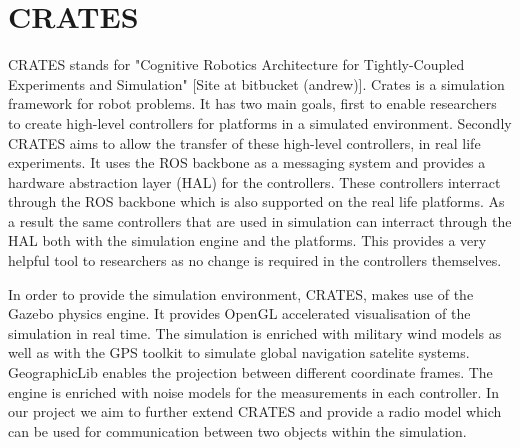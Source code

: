 \section{CRATES}
CRATES stands for "Cognitive Robotics Architecture for Tightly-Coupled
Experiments and Simulation" [Site at bitbucket (andrew)]. Crates is a simulation
framework for robot problems. It has two main goals, first to enable researchers
to create high-level controllers for platforms in a simulated environment.
Secondly CRATES aims to allow the transfer of these high-level controllers, in
real life experiments. It uses the ROS backbone as a messaging system and
provides a hardware abstraction layer (HAL) for the controllers. These
controllers interract through the ROS backbone which is also supported on the
real life platforms. As a result the same controllers that are used in
simulation can interract through the HAL both with the simulation engine and the
platforms. This provides a very helpful tool to researchers as no change is
required in the controllers themselves.


In order to provide the simulation environment, CRATES, makes use of the Gazebo
physics engine. It provides OpenGL accelerated visualisation of the simulation
in real time. The simulation is enriched with military wind models as well as
with the GPS toolkit to simulate global navigation satelite systems.
GeographicLib enables the projection between different coordinate frames. The
engine is enriched with noise models for the measurements in each controller. In
our project we aim to further extend CRATES and provide a radio model which can
be used for communication between two objects within the simulation.


